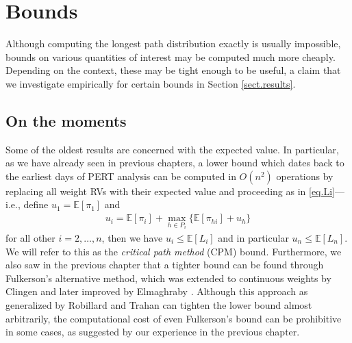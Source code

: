 \documentclass[12pt]{article}
\def\E{\mathbb{E}}
\begin{document}


\section{Bounds}
\label{sect.bounds}

Although computing the longest path distribution exactly is usually impossible, bounds on various quantities of interest may be computed much more cheaply. Depending on the context, these may be tight enough to be useful, a claim that we investigate empirically for certain bounds in Section \ref{sect.results}.

\subsection{On the moments}
\label{subsect.bounds_moments}

Some of the oldest results are concerned with the expected value. In particular, as we have already seen in previous chapters, a lower bound which dates back to the earliest days of PERT analysis can be computed in $O(n^2)$ operations by replacing all weight RVs with their expected value and proceeding as in \eqref{eq.Li}---i.e., define $u_1 = \E[\pi_1]$ and
\begin{align}
  \label{eq.ui}
  u_i = \E[\pi_i] + \max_{h \in P_i}\{ \E[\pi_{hi}] + u_h\}
\end{align}
for all other $i = 2, \dots, n$, then we have $u_i \leq \E[L_i]$ and in particular $u_n \leq \E[L_n]$. We will refer to this as the {\em critical path method} (CPM) bound. Furthermore, we also saw in the previous chapter that a tighter bound can be found through Fulkerson's \cite{ful62} alternative method, which was extended to continuous weights by Clingen \cite{cli64} and later improved by Elmaghraby \cite{elm67}. Although this approach as generalized by Robillard and Trahan \cite{rob76} can tighten the lower bound almost arbitrarily, the computational cost of even Fulkerson's bound can be prohibitive in some cases, as suggested by our experience in the previous chapter.    
\end{document}
